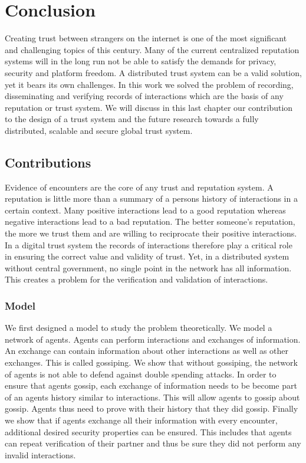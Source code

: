 \chapter{Conclusion}
Creating trust between strangers on the internet is one of the most significant and challenging topics
of this century. Many of the current centralized reputation systems will in the long run not be able
to satisfy the demands for privacy, security and platform freedom. A distributed trust system can 
be a valid solution, yet it bears its own challenges. In this work we solved the problem of recording,
disseminating and verifying records of interactions which are the basis of any reputation or trust 
system. We will discuss in this last chapter our contribution to the design of a trust system and 
the future research towards a fully distributed, scalable and secure global trust system.

\section{Contributions}
Evidence of encounters are the core of any trust and reputation system. A reputation is little more
than a summary of a persons history of interactions in a certain context. Many positive interactions
lead to a good reputation whereas negative interactions lead to a bad reputation. The better someone's
reputation, the more we trust them and are willing to reciprocate their positive interactions. In a 
digital trust system the records of interactions therefore play a critical role in ensuring the 
correct value and validity of trust. Yet, in a distributed system without central government, no 
single point in the network has all information. This creates a problem for the verification and 
validation of interactions. 

\subsection{Model}
We first designed a model to study the problem theoretically. We model a network of agents. Agents 
can perform interactions and exchanges of information. An exchange can contain information about 
other interactions as well as other exchanges. This is called gossiping. We show that without 
gossiping, the network of agents is not able to defend against double spending attacks. In order to 
ensure that agents gossip, each exchange of information needs to be become part of an agents history
similar to interactions. This will allow agents to gossip about gossip. Agents thus need to prove 
with their history that they did gossip. Finally we show that if agents exchange all their 
information with every encounter, additional desired security properties can be ensured. This includes
that agents can repeat verification of their partner and thus be sure they did not perform any 
invalid interactions. 

